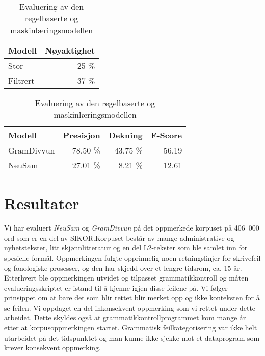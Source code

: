 \documentclass{flammie}
\begin{document}
\begin{table}[htb]
\begin{minipage}{0.45\textwidth}
        \centering
    \begin{tabular}{l|r}
        \bf{Modell} & \bf{Nøyaktighet} \\
        \hline
        Stor & 25 \% \\
        Filtrert & 37 \% \\
    \end{tabular}
    \caption{Nøyaktighet av nevrale modeller
    \label{tab:accuracy}}
    \end{minipage}
    \begin{minipage}{0.45\textwidth}
        \centering
    \begin{tabular}{l|r|r|r}
        \bf{Modell} & \bf{Presisjon} & \bf{Dekning} & \bf{F-Score} \\
        \hline
        GramDivvun & 78.50 \% & 43.75 \% & 56.19 \\
        NeuSam & 27.01 \% & 8.21 \% & 12.61 \\
    \end{tabular}
    \caption{Evaluering av den regelbaserte og maskinlæringsmodellen
    \label{tab:accuracy-ekte}}
    \end{minipage}
\end{table}

\section{Resultater}

Vi har evaluert \textit{NeuSam} og \textit{GramDivvun} på det oppmerkede
korpuset på 406~000 ord som er en del av SIKOR.\@  Korpuset består av mange
administrative og nyhetstekster, litt skjønnlitteratur og en del L2-tekster som
ble samlet inn for spesielle formål. Oppmerkingen fulgte opprinnelig noen
retningslinjer for skrivefeil og fonologiske prosesser, og den har skjedd over
et lengre tidsrom, ca. 15 år.  Etterhvert ble oppmerkingen utvidet og tilpasset
grammatikkontroll og måten evalueringsskriptet er istand til å kjenne igjen
disse feilene på.  Vi følger prinsippet om at bare det som blir rettet blir
merket opp og ikke konteksten for å se feilen.  Vi oppdaget en del inkonsekvent
oppmerking som vi rettet under dette arbeidet. Dette skyldes også at
grammatikkontrollprogrammet kom mange år etter at korpusoppmerkingen startet.
Grammatisk feilkategorisering var ikke helt utarbeidet på det tidspunktet og man
kunne ikke sjekke mot et dataprogram som krever konsekvent oppmerking.
\end{document}
